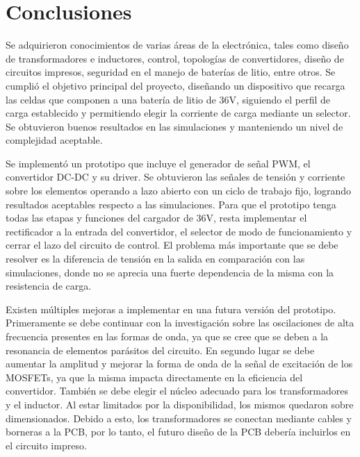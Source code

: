 \section{Conclusiones}

  

Se adquirieron conocimientos de varias áreas de la electrónica, tales como diseño de transformadores e inductores, control, topologías de convertidores, diseño de circuitos impresos, seguridad en el manejo de baterías de litio, entre otros.
Se cumplió el objetivo principal del proyecto, diseñando un dispositivo que recarga las celdas que componen a una batería de litio de 36V, siguiendo el perfil de carga establecido y permitiendo elegir la corriente de carga mediante un selector.
Se obtuvieron buenos resultados en las simulaciones y manteniendo un nivel de complejidad aceptable.

Se implementó un prototipo que incluye el generador de señal PWM, el convertidor DC-DC y su driver.
Se obtuvieron las señales de tensión y corriente sobre los elementos operando a lazo abierto con un ciclo de trabajo fijo, logrando resultados aceptables respecto a las simulaciones.
Para que el prototipo tenga todas las etapas y funciones del cargador de 36V, resta implementar el rectificador a la entrada del convertidor, el selector de modo de funcionamiento y cerrar el lazo del circuito de control.
El problema más importante que se debe resolver es la diferencia de tensión en la salida en comparación con las simulaciones, donde no se aprecia una fuerte dependencia de la misma con la resistencia de carga.

Existen múltiples mejoras a implementar en una futura versión del prototipo.
Primeramente se debe continuar con la investigación sobre las oscilaciones de alta frecuencia presentes en las formas de onda, ya que se cree que se deben a la resonancia de elementos parásitos del circuito.
En segundo lugar se debe aumentar la amplitud y mejorar la forma de onda de la señal de excitación de los MOSFETs, ya que la misma impacta directamente en la eficiencia del convertidor.
También se debe elegir el núcleo adecuado para los transformadores y el inductor. Al estar limitados por la disponibilidad, los mismos quedaron sobre dimensionados. 
Debido a esto, los transformadores se conectan mediante cables y borneras a la PCB, por lo tanto, el futuro diseño de la PCB debería incluirlos en el circuito impreso.
